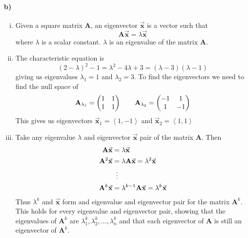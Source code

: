 \documentclass[12pt]{article}
\begin{document}
\paragraph{b)}

\begin{enumerate}[i)]
        \item Given a square matrix \(\mathbf{A}\), an eigenvector \(\vec{\mathbf{x}}\) is a vector such that
                \[\mathbf{A}\vec{\mathbf{x}}=\lambda\vec{\mathbf{x}}\]
                where \(\lambda\) is a scalar constant. \(\lambda\) is an eigenvalue of the matrix \(\mathbf{A}\).
        \item The characteristic equation is
                \[(2-\lambda)^2-1=\lambda^2-4\lambda+3=(\lambda-3)(\lambda-1)\]
                giving us eigenvalues \(\lambda_1=1\) and \(\lambda_2=3\). To find the eigenvectors we need to find the null space of
                \[\mathbf{A}_{\lambda_1}=\left(
                        \begin{array}{@{}cc@{}}
                                1&1\\
                                1&1
                        \end{array}
                \right)
                \qquad
                \mathbf{A}_{\lambda_2}=\left(
                        \begin{array}{@{}cc@{}}
                                -1&1\\
                                1&-1
                        \end{array}
                \right)\]
                This gives us eigenvectors \(\vec{\mathbf{x}}_1=\left<1,-1\right>\) and \(\vec{\mathbf{x}}_2=\left<1,1\right>\)
        \item Take any eigenvalue \(\lambda\) and eigenvector \(\vec{\mathbf{x}}\) pair of the matrix \(\mathbf{A}\). Then
                \begin{align*}
                        \mathbf{A}\vec{\mathbf{x}}&=\lambda\vec{\mathbf{x}}\\
                        \mathbf{A}^2\vec{\mathbf{x}}&=\lambda\mathbf{A}\vec{\mathbf{x}}=\lambda^2\vec{\mathbf{x}}\\
                        &\mathrel{\makebox[\widthof{=}]{\vdots}}\\
                        \mathbf{A}^k\vec{\mathbf{x}}&=\lambda^{k-1}\mathbf{A}\vec{\mathbf{x}}=\lambda^k\vec{\mathbf{x}}
                \end{align*}
                Thus \(\lambda^k\) and \(\vec{\mathbf{x}}\) form and eigenvalue and eigenvector pair for the matrix \(\mathbf{A}^k\). This
                holds for every eigenvalue and eigenvector pair, showing that the eigenvalues of \(\mathbf{A}^k\) are \(\lambda_1^k,\lambda_2^k,\ldots,\lambda_n^k\)
                and that each eigenvector of \(\mathbf{A}\) is still an eigenvector of \(\mathbf{A}^k\).
\end{enumerate}
\end{document}
